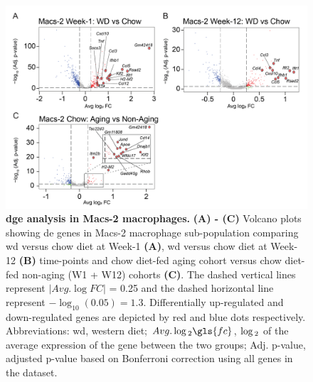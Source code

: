 \begin{figure}[H]
    \centering
    \includegraphics[width=13cm]{Appendix2/Fig/F2-A7-02.png}
    \caption[ analysis in Macs-2 macrophages]{\textbf{\gls{dge} analysis in Macs-2 macrophages.} \textbf{(A) - (C)} Volcano plots showing \gls{de} genes in Macs-2 macrophage sub-population comparing \gls{wd} versus chow diet at Week-1 \textbf{(A)}, \gls{wd} versus chow diet at Week-12 \textbf{(B)} time-points and chow diet-fed aging cohort versus chow diet-fed non-aging (W1 + W12) cohorts \textbf{(C)}. The dashed vertical lines represent $  \left|Avg. \log FC \right| $ = 0.25 and the dashed horizontal line represent $-\log_{10}(\num{0.05}) = 1.3$. Differentially up-regulated and down-regulated genes are depicted by red and blue dots respectively. Abbreviations: \gls{wd}, western diet; $Avg. \log\textsubscript{2} \gls{fc}$, $\log\textsubscript{2}$  of the average expression of the gene between the two groups; Adj. p-value, adjusted p-value based on Bonferroni correction using all genes in the dataset.}
    \label{fig:app_scrna_macrophages_macs2_dge}
\end{figure}

